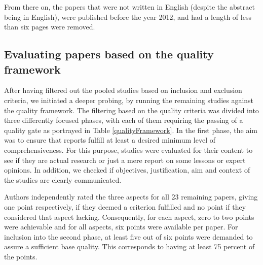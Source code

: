 \documentclass[a4paper,11pt,article,oneside]{memoir}
\begin{document}

From there on, the papers that were not written in English (despite the abstract being in English), were published before the year 2012, and had a length of less than six pages were removed.



\subsection{Evaluating papers based on the quality framework}

After having filtered out the pooled studies based on inclusion and exclusion criteria, we initiated a deeper probing, by running the remaining studies against the quality framework. The filtering based on the quality criteria was divided into three differently focused phases, with each of them requiring the passing of a quality gate as portrayed in Table \ref{qualityFramework}. In the first phase, the aim was to ensure that reports fulfill at least a desired minimum level of comprehensiveness. For this purpose, studies were evaluated for their content to see if they are actual research or just a mere report on some lessons or expert opinions. In addition, we checked if objectives, justification, aim and context of the studies are clearly communicated.



Authors independently rated the three aspects for all 23 remaining papers, giving one point respectively, if they deemed a criterion fulfilled and no point if they considered that aspect lacking. Consequently, for each aspect, zero to two points were achievable and for all aspects, six points were available per paper. For inclusion into the second phase, at least five out of six points were demanded to assure a sufficient base quality. This corresponds to having at least 75 percent of the points. 
\end{document}
